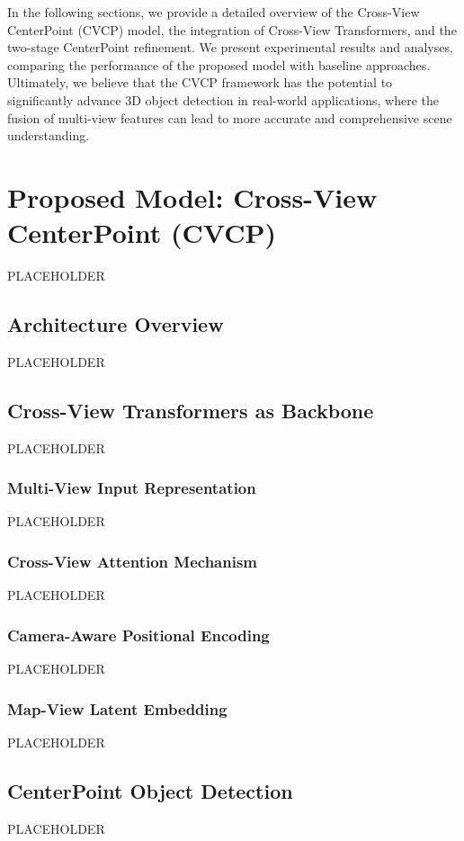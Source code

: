 \documentclass[twocolumn, times]{article}
\begin{document}
In the following sections, we provide a detailed overview of the Cross-View CenterPoint (CVCP) model, the integration of Cross-View Transformers, and the two-stage CenterPoint refinement. We present experimental results and analyses, comparing the performance of the proposed model with baseline approaches. Ultimately, we believe that the CVCP framework has the potential to significantly advance 3D object detection in real-world applications, where the fusion of multi-view features can lead to more accurate and comprehensive scene understanding.

\section{Proposed Model: Cross-View CenterPoint (CVCP)}
PLACEHOLDER

\subsection{Architecture Overview}
PLACEHOLDER

\subsection{Cross-View Transformers as Backbone}
PLACEHOLDER

\subsubsection{Multi-View Input Representation}
PLACEHOLDER

\subsubsection{Cross-View Attention Mechanism}
PLACEHOLDER

\subsubsection{Camera-Aware Positional Encoding}
PLACEHOLDER

\subsubsection{Map-View Latent Embedding}
PLACEHOLDER

\subsection{CenterPoint Object Detection}
PLACEHOLDER
\end{document}
